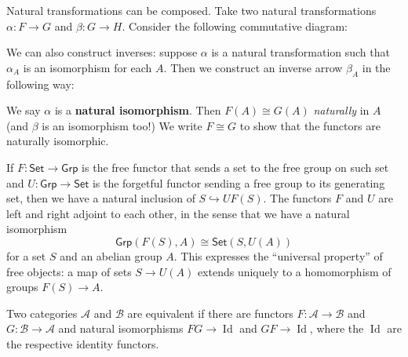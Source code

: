 Natural transformations can be composed. Take two natural transformations $\alpha \colon F \to G$ and $\beta \colon G \to H$. Consider the following commutative diagram: 
            \begin{figure}[H]
                \centering
            \end{figure}
    We can also construct inverses: suppose $\alpha$ is a natural transformation such that $\alpha_A$ is an isomorphism for each $A$. Then we construct an inverse arrow $\beta_A$ in the following way:
            \begin{figure}[H]
                \centering
            \end{figure}
            We say $\alpha$ is a \textbf{natural isomorphism}. Then $F(A)\cong G(A)$ \emph{naturally} in $A$ (and $\beta$ is an isomorphism too!) We write $F\cong G$ to show that the functors are naturally isomorphic.
\begin{example}
    If $F \colon \mathsf{Set} \to \mathsf{Grp}$ is the free functor that sends a set to the free group on such set and $U \colon \mathsf{Grp} \to \mathsf{Set}$ is the forgetful functor sending a free group to its generating set, then we have a natural inclusion of $S\hookrightarrow UF(S)$. The functors $F$ and $U$ are left and right adjoint to each other, in the sense that we have a natural isomorphism \[
        \mathsf{Grp}(F(S),A)\cong \mathsf{Set}(S,U(A))
    \] for a set $S$ and an abelian group $A$. This expresses the ``universal property'' of free objects: a map of sets $S\to U(A)$ extends uniquely to a homomorphism of groups $F(S)\to A$. 
\end{example}
\begin{definition}
    Two categories $\mathcal{A}$ and $\mathcal{B}$ are equivalent if there are functors $F \colon \mathcal{A} \to \mathcal{B}$ and $G \colon \mathcal{B} \to \mathcal{A}$ and natural isomorphisms $FG \to \operatorname{Id}$ and $GF \to \operatorname{Id}$, where the $\operatorname{Id}$ are the respective identity functors.
\end{definition}

